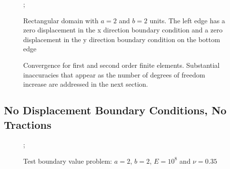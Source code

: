 \documentclass{article}
\begin{document}
\begin{figure}
    ;
    \caption{Rectangular domain with $a=2$ and $b=2$ units. The left edge has a zero displacement in the x direction boundary condition and a zero displacement in the y direction boundary condition on the bottom edge}
\centering
\end{figure}

\begin{figure}
    \caption{Convergence for first and second order finite elements. Substantial inaccuracies that appear as the number of degrees of freedom increase are addressed in the next section.}
\centering
\end{figure}

\pagebreak
\subsection{No Displacement Boundary Conditions, No Tractions}
\FloatBarrier

\begin{figure}
    ;
    \caption{Test boundary value problem: $a = 2$, $b = 2$, $E = 10^8$ and $\nu = 0.35$}
\centering
\end{figure}
\end{document}

